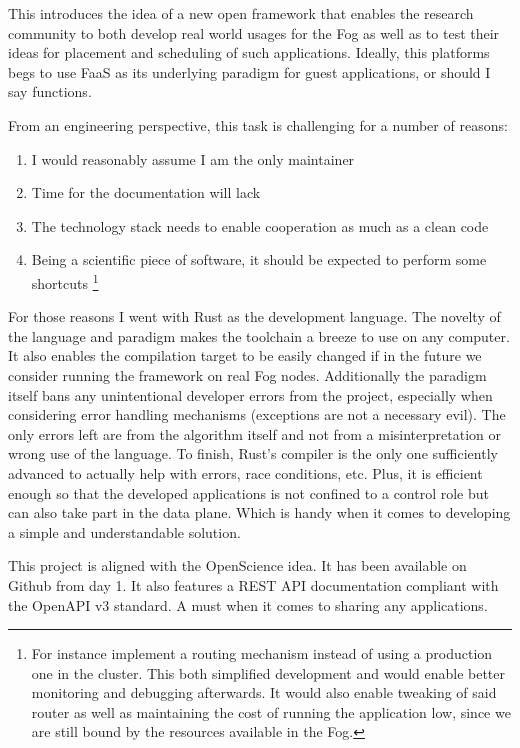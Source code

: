 \documentclass[11pt]{sdm}
\begin{document}
This introduces the idea of a new open framework that enables the research community to both develop real world usages for the Fog as well as to test their ideas for placement and scheduling of such applications. Ideally, this platforms begs to use \gls{FaaS} as its underlying paradigm for guest applications, or should I say functions.

From an engineering perspective, this task is challenging for a number of reasons:
\begin{enumerate}
	\item I would reasonably assume I am the only maintainer
	\item Time for the documentation will lack
	\item The technology stack needs to enable cooperation as much as a clean code
	\item Being a scientific piece of software, it should be expected to perform some shortcuts \footnote{For instance implement a routing mechanism instead of using a production one in the cluster. This both simplified development and would enable better monitoring and debugging afterwards. It would also enable tweaking of said router as well as maintaining the cost of running the application low, since we are still bound by the resources available in the Fog.}
\end{enumerate}

For those reasons I went with Rust as the development language. The novelty of the language and paradigm makes the toolchain a breeze to use on any computer. It also enables the compilation target to be easily changed if in the future we consider running the framework on real Fog nodes. Additionally the paradigm itself bans any unintentional developer errors from the project, especially when considering error handling mechanisms (exceptions are not a necessary evil). The only errors left are from the algorithm itself and not from a misinterpretation or wrong use of the language. To finish, Rust's compiler is the only one sufficiently advanced to actually help with errors, race conditions, etc. Plus, it is efficient enough so that the developed applications is not confined to a control role but can also take part in the data plane. Which is handy when it comes to developing a simple and understandable solution.

This project is aligned with the OpenScience idea. It has been available on Github from day 1. It also features a REST API documentation compliant with the OpenAPI v3 standard. A must when it comes to sharing any applications.
\end{document}
